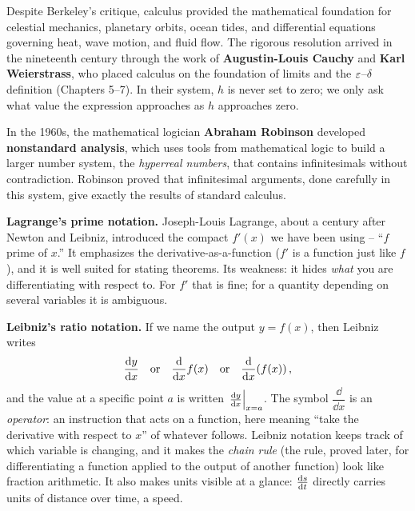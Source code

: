 \begin{historybox}
Despite Berkeley's critique, calculus provided the mathematical foundation for
celestial mechanics, planetary orbits, ocean tides, and differential equations
governing heat, wave motion, and fluid flow. The rigorous resolution arrived in the
nineteenth century through the work of \textbf{Augustin-Louis Cauchy} and
\textbf{Karl Weierstrass}, who placed calculus on the foundation of limits
and the $\varepsilon$--$\delta$ definition (Chapters 5--7). In their system, $h$ is never
set to zero; we only ask what value the expression approaches as $h$ approaches zero.

In the 1960s, the mathematical logician \textbf{Abraham Robinson} developed
\textbf{nonstandard analysis}, which uses tools from mathematical logic to build
a larger number system, the \emph{hyperreal numbers}, that contains
infinitesimals without contradiction. Robinson proved that infinitesimal
arguments, done carefully in this system, give exactly the results of standard
calculus.
\end{historybox}

\textbf{Lagrange's prime notation.} Joseph-Louis Lagrange, about a century
after Newton and Leibniz, introduced the
compact $f'(x)$ we have been using -- ``$f$ prime of $x$.'' It
emphasizes the derivative-as-a-function ($f'$ is a function just like $f$), and it
is well suited for stating theorems. Its weakness: it hides \emph{what} you are
differentiating with respect to. For $f'$ that is fine; for a quantity depending
on several variables it is ambiguous.

\textbf{Leibniz's ratio notation.} If we name the output $y = f(x)$, then Leibniz
writes
\[
  \frac{\mathrm{d} y}{\mathrm{d} x} \quad\text{or}\quad \frac{\mathrm{d}}{\mathrm{d} x}f(x) \quad\text{or}\quad
  \frac{\mathrm{d}}{\mathrm{d} x}\!\left(f(x)\right),
\]
and the value at a specific point $a$ is written
$\left.\frac{\mathrm{d} y}{\mathrm{d} x}\right|_{x=a}$. The symbol $\dfrac{\dd}{\dd x}$ is an
\emph{operator}: an instruction that acts on a function, here meaning ``take the
derivative with respect to $x$'' of whatever follows.
Leibniz notation keeps track of which variable is changing, and it makes the
\emph{chain rule} (the rule, proved later, for differentiating a function
applied to the output of another function) look like fraction arithmetic.
It also makes units visible at a glance: $\frac{\mathrm{d} s}{\mathrm{d} t}$ directly carries units of distance over
time, a speed.

